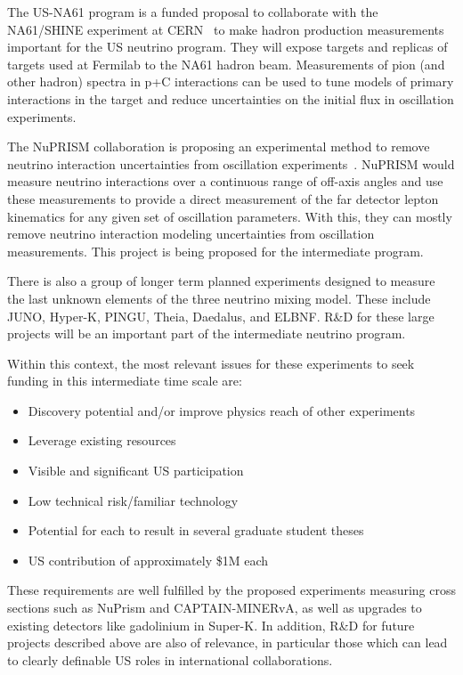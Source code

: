 The US-NA61 program is a funded proposal to collaborate with the
NA61/SHINE experiment at CERN~\cite{Gazdzicki:2014bxa} to make hadron
production measurements important for the US neutrino program.  They
will expose targets and replicas of targets used at Fermilab to the
NA61 hadron beam.  Measurements of pion (and other hadron) spectra in
p+C interactions can be used to tune models of primary interactions in
the target and reduce uncertainties on the initial flux in oscillation
experiments.

The NuPRISM collaboration is proposing an experimental method to
remove neutrino interaction uncertainties from oscillation
experiments~\cite{Bhadra:2014oma}.  NuPRISM would measure neutrino
interactions over a continuous range of off-axis angles and use these
measurements to provide a direct measurement of the far detector
lepton kinematics for any given set of oscillation parameters.  With
this, they can mostly remove neutrino interaction modeling
uncertainties from oscillation measurements.  This project is being
proposed for the intermediate program.

There is also a group of longer term planned experiments designed to
measure the last unknown elements of the three neutrino mixing model.
These include JUNO, Hyper-K, PINGU, Theia, Daedalus, and ELBNF. R\&D
for these large projects will be an important part of the intermediate
neutrino program.

Within this context, the most relevant issues for these experiments
to seek funding in this intermediate time scale are:
\vspace*{-0.4cm}
\begin{itemize}
\item Discovery potential and/or improve physics reach of other experiments
\vspace*{-0.4cm}
\item Leverage existing resources \vspace*{-0.4cm}
\item Visible and significant US participation \vspace*{-0.4cm}
\item Low technical risk/familiar technology \vspace*{-0.4cm}
\item Potential for each to result in several graduate student theses \vspace*{-0.4cm}
\item US contribution of approximately \$1M each \vspace*{-0.4cm}
\end{itemize}

These requirements are well fulfilled by the proposed experiments
measuring cross sections such as NuPrism and CAPTAIN-MINERvA, as well
as upgrades to existing detectors like gadolinium in Super-K.  In
addition, R\&D for future projects described above are also of
relevance, in particular those which can lead to clearly definable US
roles in international collaborations.
